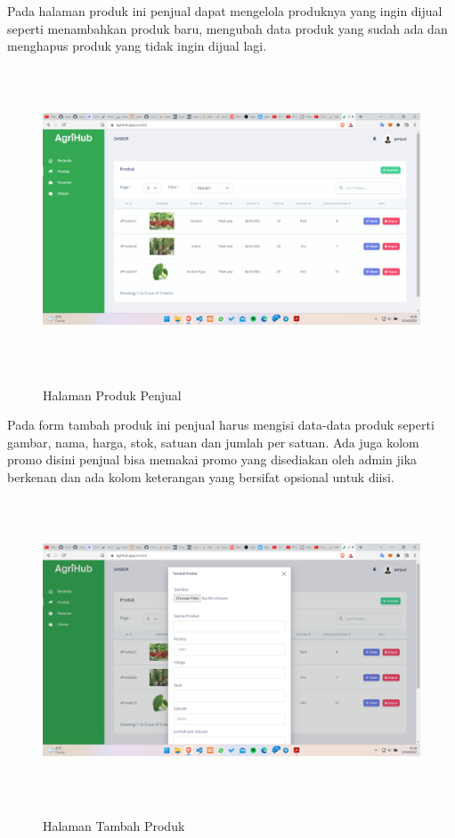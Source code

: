 \begin{enumerate}
\begin{enumerate}
			\par Pada halaman produk ini penjual dapat mengelola produknya yang ingin dijual seperti menambahkan produk baru, mengubah data produk yang sudah ada dan menghapus produk yang tidak ingin dijual lagi.

			\begin{figure}[H]
				\centering
				{\includegraphics [width = 14.3cm, height= 9cm]{gambar/penjual/produk_penjual}}
				\caption{Halaman Produk Penjual}
				\label{produk_penjual}
			\end{figure}

			\par Pada form tambah produk ini penjual harus mengisi data-data produk seperti gambar, nama, harga, stok, satuan dan jumlah per satuan. Ada juga kolom promo disini penjual bisa memakai promo yang disediakan oleh admin jika berkenan dan ada kolom keterangan yang bersifat opsional untuk diisi.

			\begin{figure}[H]
				\centering
				{\includegraphics [width = 14.3cm, height= 9cm]{gambar/penjual/tambah_produk}}
				\caption{Halaman Tambah Produk}
				\label{tambah_produk}
			\end{figure}


\end{enumerate}
\end{enumerate}
